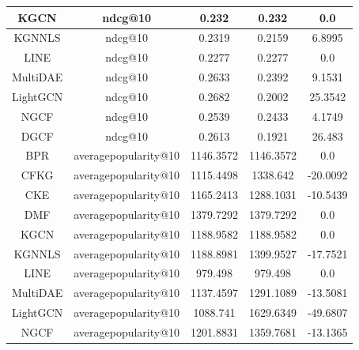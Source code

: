 \begin{table}[H]
{\begin{tabular}{|c|c|c|c|c|}
    KGCN     & ndcg@10             & 0.232                   & 0.232                     & 0.0               \\\hline
    KGNNLS   & ndcg@10             & 0.2319                  & 0.2159                    & 6.8995            \\\hline
    LINE     & ndcg@10             & 0.2277                  & 0.2277                    & 0.0               \\\hline
    MultiDAE & ndcg@10             & 0.2633                  & 0.2392                    & 9.1531            \\\hline
    LightGCN & ndcg@10             & 0.2682                  & 0.2002                    & 25.3542           \\\hline
    NGCF     & ndcg@10             & 0.2539                  & 0.2433                    & 4.1749            \\\hline
    DGCF     & ndcg@10             & 0.2613                  & 0.1921                    & 26.483            \\\hline
    BPR      & averagepopularity@10 & 1146.3572              & 1146.3572                 & 0.0               \\\hline
    CFKG     & averagepopularity@10 & 1115.4498              & 1338.642                  & -20.0092          \\\hline
    CKE      & averagepopularity@10 & 1165.2413              & 1288.1031                 & -10.5439          \\\hline
    DMF      & averagepopularity@10 & 1379.7292              & 1379.7292                 & 0.0               \\\hline
    KGCN     & averagepopularity@10 & 1188.9582              & 1188.9582                 & 0.0               \\\hline
    KGNNLS   & averagepopularity@10 & 1188.8981              & 1399.9527                 & -17.7521          \\\hline
    LINE     & averagepopularity@10 & 979.498                & 979.498                   & 0.0               \\\hline
    MultiDAE & averagepopularity@10 & 1137.4597              & 1291.1089                 & -13.5081          \\\hline
    LightGCN & averagepopularity@10 & 1088.741               & 1629.6349                 & -49.6807          \\\hline
    NGCF     & averagepopularity@10 & 1201.8831              & 1359.7681                 & -13.1365          \\\hline

\end{tabular}}
\end{table}
